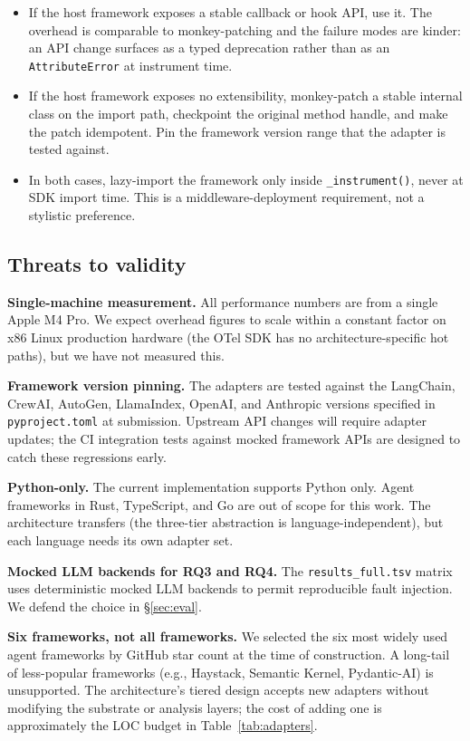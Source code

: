 \documentclass[sigconf,review,anonymous,9pt]{acmart}
\begin{document}
\begin{itemize}[leftmargin=*,nosep]
  \item If the host framework exposes a stable callback or hook API,
    use it. The overhead is comparable to monkey-patching and the
    failure modes are kinder: an API change surfaces as a typed
    deprecation rather than as an \texttt{AttributeError} at
    instrument time.
  \item If the host framework exposes no extensibility, monkey-patch
    a stable internal class on the import path, checkpoint the
    original method handle, and make the patch idempotent. Pin the
    framework version range that the adapter is tested against.
  \item In both cases, lazy-import the framework only inside
    \texttt{\_instrument()}, never at SDK import time. This is a
    middleware-deployment requirement, not a stylistic preference.
\end{itemize}

\subsection{Threats to validity}

\textbf{Single-machine measurement.} All performance numbers are from
a single Apple M4 Pro. We expect overhead figures to scale within a
constant factor on x86 Linux production hardware (the OTel SDK has no
architecture-specific hot paths), but we have not measured this.

\textbf{Framework version pinning.} The adapters are tested against
the LangChain, CrewAI, AutoGen, LlamaIndex, OpenAI, and Anthropic
versions specified in \texttt{pyproject.toml} at submission. Upstream
API changes will require adapter updates; the CI integration tests
against mocked framework APIs are designed to catch these regressions
early.

\textbf{Python-only.} The current implementation supports Python
only. Agent frameworks in Rust, TypeScript, and Go are out of scope
for this work. The architecture transfers (the three-tier abstraction
is language-independent), but each language needs its own adapter
set.

\textbf{Mocked LLM backends for RQ3 and RQ4.} The
\texttt{results\_full.tsv} matrix uses deterministic mocked LLM
backends to permit reproducible fault injection. We defend the choice
in \S\ref{sec:eval}.

\textbf{Six frameworks, not all frameworks.} We selected the six
most widely used agent frameworks by GitHub star count at the time
of construction. A long-tail of less-popular frameworks (e.g.,
Haystack, Semantic Kernel, Pydantic-AI) is unsupported. The
architecture's tiered design accepts new adapters without modifying
the substrate or analysis layers; the cost of adding one is
approximately the LOC budget in Table~\ref{tab:adapters}.
\end{document}
